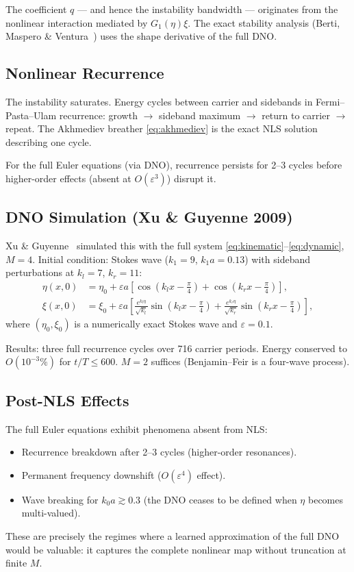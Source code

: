 \documentclass[11pt]{article}
\newcommand{\eps}{\varepsilon}
\begin{document}
The coefficient $q$ --- and hence the instability bandwidth --- originates
from the nonlinear interaction mediated by $G_1(\eta)\xi$.
The exact stability analysis (Berti, Maspero \& Ventura~\cite{berti2022})
uses the shape derivative of the full DNO.

\subsection{Nonlinear Recurrence}

The instability saturates.
Energy cycles between carrier and sidebands in Fermi--Pasta--Ulam recurrence:
growth $\to$ sideband maximum $\to$ return to carrier $\to$ repeat.
The Akhmediev breather \eqref{eq:akhmediev} is the exact NLS solution
describing one cycle.

For the full Euler equations (via DNO), recurrence persists for 2--3 cycles
before higher-order effects (absent at $O(\eps^3)$) disrupt it.

\subsection{DNO Simulation (Xu \& Guyenne 2009)}

Xu \& Guyenne~\cite{xu2009} simulated this with the full system
\eqref{eq:kinematic}--\eqref{eq:dynamic}, $M = 4$.
Initial condition: Stokes wave ($k_1 = 9$, $k_1 a = 0.13$) with
sideband perturbations at $k_l = 7$, $k_r = 11$:
\begin{align}
\eta(x,0) &= \eta_0 + \eps a\left[\cos\!\left(k_l x - \tfrac{\pi}{4}\right)
+ \cos\!\left(k_r x - \tfrac{\pi}{4}\right)\right],
\label{eq:bf_eta_ic}\\
\xi(x,0) &= \xi_0 + \eps a\left[\frac{e^{k_l\eta}}{\sqrt{k_l}}
\sin\!\left(k_l x - \tfrac{\pi}{4}\right)
+ \frac{e^{k_r\eta}}{\sqrt{k_r}}
\sin\!\left(k_r x - \tfrac{\pi}{4}\right)\right],
\label{eq:bf_xi_ic}
\end{align}
where $(\eta_0, \xi_0)$ is a numerically exact Stokes wave and $\eps = 0.1$.

Results: three full recurrence cycles over 716 carrier periods.
Energy conserved to $O(10^{-3}\%)$ for $t/T \leq 600$.
$M = 2$ suffices (Benjamin--Feir is a four-wave process).

\subsection{Post-NLS Effects}

The full Euler equations exhibit phenomena absent from NLS:
\begin{itemize}
\item Recurrence breakdown after 2--3 cycles (higher-order resonances).
\item Permanent frequency downshift ($O(\eps^4)$ effect).
\item Wave breaking for $k_0 a \gtrsim 0.3$ (the DNO ceases to be defined
when $\eta$ becomes multi-valued).
\end{itemize}
These are precisely the regimes where a learned approximation of the
full DNO would be valuable: it captures the complete nonlinear map
without truncation at finite $M$.
\end{document}
